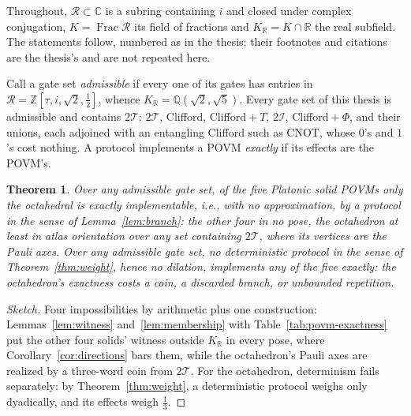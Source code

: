 \documentclass[11pt,a4paper]{article}
\newcommand{\C}{\mathbb{C}}
\newcommand{\R}{\mathbb{R}}
\newcommand{\Tgroup}{\mathcal{T}}
\newcommand{\Igroup}{\mathcal{I}}
\newcommand{\TwoT}{2\Tgroup}
\newcommand{\TwoI}{2\Igroup}
\newcommand{\phig}{\tau}      %
\newenvironment{sketch}{\renewcommand{\qedsymbol}{}\begin{proof}[Sketch]}{\end{proof}}
\newtheorem{theorem}{Theorem}
\begin{document}
Throughout, $\mathcal{R} \subset \C$ is a subring containing $i$ and closed under complex conjugation, $K = \operatorname{Frac}\mathcal{R}$ its field of fractions and $K_\R = K \cap \R$ the real subfield. The statements follow, numbered as in the thesis; their footnotes and citations are the thesis's and are not repeated here.

Call a gate set \textit{admissible} if every one of its gates has entries in $\mathcal{R} = \mathbb{Z}[\phig, i, \sqrt{2}, \tfrac{1}{2}]$, whence $K_\R = \mathbb{Q}(\sqrt{2},\sqrt{5})$. Every gate set of this thesis is admissible and contains $\TwoT$: $\TwoT$, Clifford, Clifford${}+T$, $\TwoI$, Clifford${}+\Phi$, and their unions, each adjoined with an entangling Clifford such as CNOT, whose $0$'s and $1$'s cost nothing. A protocol implements a POVM \textit{exactly} if its effects are the POVM's.

\begin{theorem} \label{thm:main}
Over any admissible gate set, of the five Platonic solid POVMs only the octahedral is exactly implementable, i.e., with no approximation, by a protocol in the sense of Lemma~\ref{lem:branch}: the other four in no pose, the octahedron at least in atlas orientation over any set containing $\TwoT$, where its vertices are the Pauli axes. Over any admissible gate set, no deterministic protocol in the sense of Theorem~\ref{thm:weight}, hence no dilation, implements any of the five exactly: the octahedron's exactness costs a coin, a discarded branch, or unbounded repetition.
\end{theorem}

\begin{sketch}
Four impossibilities by arithmetic plus one construction: Lemmas~\ref{lem:witness} and~\ref{lem:membership} with Table~\ref{tab:povm-exactness} put the other four solids' witness outside $K_\R$ in every pose, where Corollary~\ref{cor:directions} bars them, while the octahedron's Pauli axes are realized by a three-word coin from $\TwoT$. For the octahedron, determinism fails separately: by Theorem~\ref{thm:weight}, a deterministic protocol weighs only dyadically, and its effects weigh $\tfrac{1}{3}$.
\end{sketch}
\end{document}

